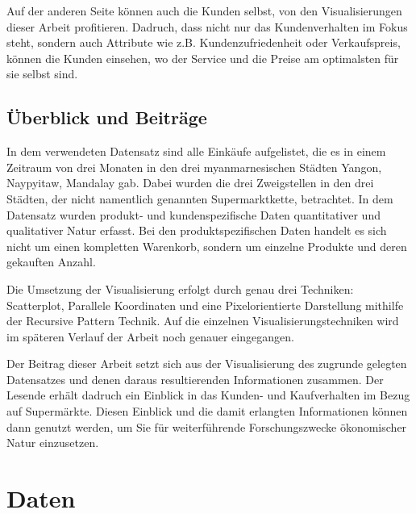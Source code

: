 \documentclass[usegeometry=true]{scrartcl}
\begin{document}
\noindent Auf der anderen Seite können auch die Kunden selbst, von den Visualisierungen dieser Arbeit profitieren. Dadruch, dass nicht nur das Kundenverhalten im Fokus steht,
sondern auch Attribute wie z.B. Kundenzufriedenheit oder Verkaufspreis, können die Kunden einsehen, wo der Service und die Preise am optimalsten für sie selbst sind.

\subsection{Überblick und Beiträge}
In dem verwendeten Datensatz sind alle Einkäufe aufgelistet, die es in einem Zeitraum von drei Monaten in den drei myanmarnesischen Städten Yangon, Naypyitaw, Mandalay gab.
Dabei wurden die drei Zweigstellen in den drei Städten, der nicht namentlich genannten Supermarktkette, betrachtet. In dem Datensatz wurden produkt- und kundenspezifische
Daten quantitativer und qualitativer Natur erfasst. Bei den produktspezifischen Daten handelt es sich nicht um einen kompletten Warenkorb, sondern
um einzelne Produkte und deren gekauften Anzahl.

\noindent Die Umsetzung der Visualisierung erfolgt durch genau drei Techniken: Scatterplot, Parallele Koordinaten und eine Pixelorientierte Darstellung mithilfe der Recursive Pattern
Technik. Auf die einzelnen Visualisierungstechniken wird im späteren Verlauf der Arbeit noch genauer eingegangen.

\noindent Der Beitrag dieser Arbeit setzt sich aus der Visualisierung des zugrunde gelegten Datensatzes und denen daraus resultierenden Informationen zusammen. Der Lesende erhält
dadruch ein Einblick in das Kunden- und Kaufverhalten im Bezug auf Supermärkte. Diesen Einblick und die damit erlangten Informationen können dann genutzt werden, um Sie für
weiterführende Forschungszwecke ökonomischer Natur einzusetzen.

\section{Daten}

\printbibliography
\end{document}
